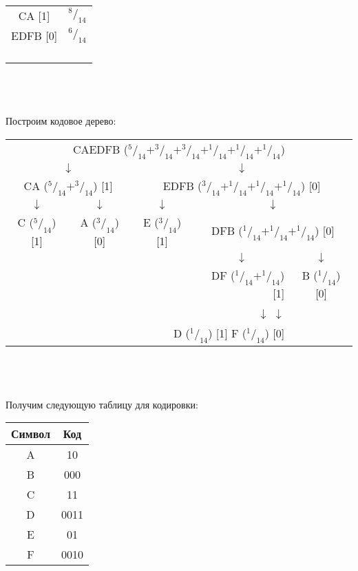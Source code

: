 \\
\begin{minipage}[h]{6cm}
\begin{tabular}{|c|c|}
\hline
CA [1] & $^8/_{14}$ \\
EDFB [0] & $^6/_{14}$ \\
& \\
& \\
& \\
& \\
\hline
\end{tabular}
\end{minipage}
\\\\
\\Построим кодовое дерево:
\\
\begin{minipage}[!h]{\textwidth}
\centering
\begin{tabular}{c c c c c c}
\multicolumn{6}{c}{CAEDFB ($^5/_{14} + ^3/_{14} + ^3/_{14} + ^1/_{14} + ^1/_{14} + ^1/_{14}$)} \\
\multicolumn{2}{c}{$\downarrow$} & \multicolumn{4}{c}{$\downarrow$} \\
\multicolumn{2}{c}{CA ($^5/_{14} + ^3/_{14}$) [1]} & \multicolumn{4}{c}{EDFB ($^3/_{14} + ^1/_{14} + ^1/_{14} + ^1/_{14}$) [0]} \\
$\downarrow$ & $\downarrow$ & \qquad $\downarrow$ & \multicolumn{3}{c}{$\downarrow$} \\
C ($^5/_{14}$) [1] & A ($^3/_{14}$) [0] & E ($^3/_{14}$) [1] & \multicolumn{3}{c}{DFB ($^1/_{14} + ^1/_{14} + ^1/_{14}$) [0]} \\
& & & \multicolumn{2}{c}{$\downarrow$} & $\downarrow$ \\
& & & \multicolumn{2}{r}{DF ($^1/_{14} + ^1/_{14}$) [1]} & B ($^1/_{14}$) [0] \\
\multicolumn{5}{r}{$\downarrow$ \qquad \qquad $\downarrow$ \qquad \qquad} & \\
\multicolumn{5}{r}{D ($^1/_{14}$) [1] \qquad  F ($^1/_{14}$) [0]} & \\
\end{tabular}
\end{minipage}
\\
\\
\\Получим следующую таблицу для кодировки:
\begin{table}[h]
\begin{tabular}{|c|c|}
\hline
Символ &  Код \\
\hline
A & 10 \\
B & 000 \\
C & 11 \\
D & 0011 \\
E & 01 \\
F & 0010 \\
\hline
\end{tabular}
\end{table}
